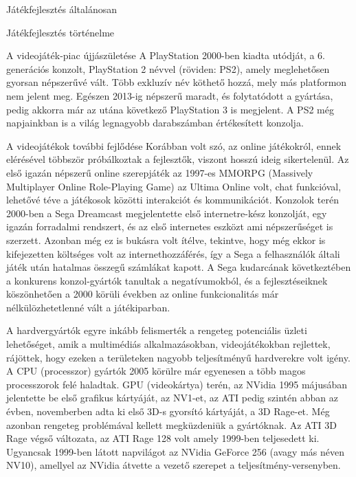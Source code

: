 \begin{MyChapter}{Játékfejlesztés általánosan}
\begin{MySection}{Játékfejlesztés történelme}
\begin{MySubSection}{A videojáték-piac újjászületése}
		A PlayStation 2000-ben kiadta utódját, a 6. generációs konzolt, PlayStation 2 névvel (röviden: PS2), amely meglehetősen gyorsan népszerűvé vált. Több exkluzív név köthető hozzá, mely más platformon nem jelent meg. Egészen 2013-ig népszerű maradt, és folytatódott a gyártása, pedig akkorra már az utána következő PlayStation 3 is megjelent. A PS2 még napjainkban is a világ legnagyobb darabszámban értékesített konzolja.
		
		\end{MySubSection}
		
		\begin{MySubSection}{A videojátékok további fejlődése}
		Korábban volt szó, az online játékokról, ennek elérésével többször próbálkoztak a fejlesztők, viszont hosszú ideig sikertelenül. Az első igazán népszerű online szerepjáték az 1997-es MMORPG (Massively Multiplayer Online Role-Playing Game) az Ultima Online volt, chat funkcióval, lehetővé téve a játékosok közötti interakciót és kommunikációt. Konzolok terén 2000-ben a Sega Dreamcast megjelentette első internetre-kész konzolját, egy igazán forradalmi rendszert, és az első internetes eszközt ami népszerűséget is szerzett. Azonban még ez is bukásra volt ítélve, tekintve, hogy még ekkor is kifejezetten költséges volt az internethozzáférés, így a Sega a felhasználók általi játék után hatalmas összegű számlákat kapott. A Sega kudarcának következtében a konkurens konzol-gyártók tanultak a negatívumokból, és a fejlesztéseiknek köszönhetően a 2000 körüli években az online funkcionalitás már nélkülözhetetlenné vált a játékiparban.
		
		A hardvergyártók egyre inkább felismerték a rengeteg potenciális üzleti lehetőséget, amik a multimédiás alkalmazásokban, videojátékokban rejlettek, rájöttek, hogy ezeken a területeken nagyobb teljesítményű hardverekre volt igény.
		A CPU (processzor) gyártók 2005 körülre már egyenesen a több magos processzorok felé haladtak. 
		GPU (videokártya) terén, az NVidia 1995 májusában jelentette be első grafikus kártyáját, az NV1-et, az ATI pedig szintén abban az évben, novemberben adta ki első 3D-s gyorsító kártyáját, a 3D Rage-et. Még azonban rengeteg problémával kellett megküzdeniük a gyártóknak. Az ATI 3D Rage végső változata, az ATI Rage 128 volt amely 1999-ben teljesedett ki. Ugyancsak 1999-ben látott napvilágot az NVidia GeForce 256 (avagy más néven NV10), amellyel az NVidia átvette a vezető szerepet a teljesítmény-versenyben.
		

\end{MySubSection}
\end{MySection}
\end{MyChapter}
